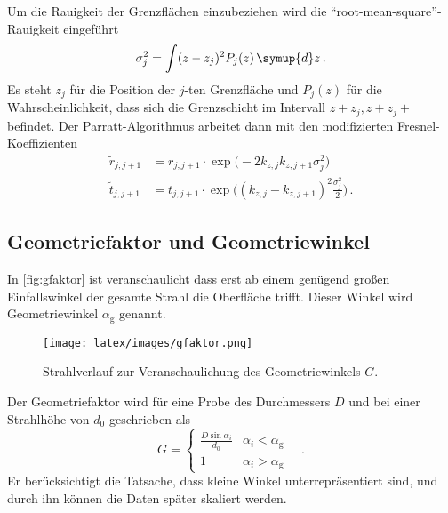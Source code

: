         \noindent
        Um die Rauigkeit der Grenzflächen einzubeziehen wird die \enquote{root-mean-square}-Rauigkeit eingeführt
        \begin{equation*}
            \sigma_j^2 = \int (z - z_j)^2 P_j(z)\, \symup{d}z\, .
        \end{equation*}
        Es steht $z_j$ für die Position der $j$-ten Grenzfläche und $P_j(z)$ für die Wahrscheinlichkeit, dass sich die Grenzschicht im Intervall 
        $ z + z_j, z + z_j + $ befindet. 
        Der Parratt-Algorithmus arbeitet dann mit den modifizierten Fresnel-Koeffizienten
        \begin{align*}
            \tilde{r}_{j, j+1} &= r_{j, j+1} \cdot \exp\biggl( - 2 k_{z, j} k_{z, j+1} \sigma_j^2\biggr) \\
            \tilde{t}_{j, j+1} &= t_{j, j+1} \cdot \exp\biggl( (k_{z,j} - k_{z, j+1})^2 \frac{\sigma_j^2}{2}\biggr)\, .
        \end{align*}

    \subsection{Geometriefaktor und Geometriewinkel}

        \noindent 
        In \autoref{fig:gfaktor} ist veranschaulicht dass erst ab einem genügend großen Einfallswinkel der gesamte Strahl die Oberfläche trifft. 
        Dieser Winkel wird Geometriewinkel $\alpha_\text{g}$ genannt. 
        \begin{figure}
            \centering
            \texttt{[image: latex/images/gfaktor.png]}
            \caption{Strahlverlauf zur Veranschaulichung des Geometriewinkels $G$. \cite{V44}}
            \label{fig:gfaktor}
        \end{figure}
        Der Geometriefaktor wird für eine Probe des Durchmessers $D$ und bei einer 
        Strahlhöhe von $d_0$ geschrieben als 
        \begin{equation}
            G = \begin{cases}
                \frac{D \sin{\alpha_i}}{d_0} & \alpha_i < \alpha_\text{g} \\
                1 & \alpha_i > \alpha_\text{g}
            \end{cases} \label{eqn:G}\quad .
        \end{equation}
        Er berücksichtigt die Tatsache, dass kleine Winkel unterrepräsentiert sind, und durch ihn können die Daten später skaliert werden. 